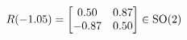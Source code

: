 \documentclass[preview]{standalone}
\begin{document}
\begin{align*}
\special{dvisvgm:raw <g id='unique000'>}R(-1.05) = \begin{bmatrix} 0.50 & 0.87 \\ -0.87 & 0.50 \end{bmatrix} \in \text{SO}(2)\special{dvisvgm:raw </g>}
\end{align*}
\end{document}
